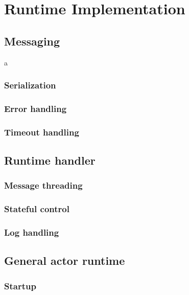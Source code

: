 \documentclass[11pt,a4paper,oneside]{report}
\begin{document}
\chapter{Runtime Implementation}\label{sect:RuntimeImpl}

	\section{Messaging}

	a

		\subsection*{Serialization}

		\subsection*{Error handling}

		\subsection*{Timeout handling}

	\section{Runtime handler}

		\subsection*{Message threading}

		\subsection*{Stateful control}

		\subsection*{Log handling}

	\section{General actor runtime}

		\subsection*{Startup}
\end{document}
